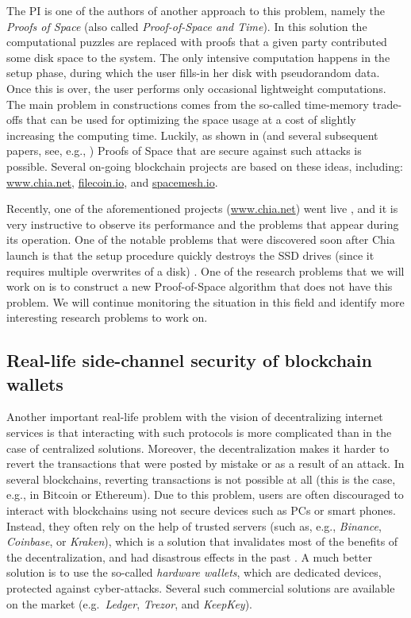 \documentclass{article}
\begin{document}
The PI is one of the authors of another approach to this problem, namely the \emph{Proofs of Space} \cite{Dziembowski2015} (also called \emph{Proof-of-Space and Time}). In this solution the computational puzzles are replaced with proofs that a given party contributed some disk space to the system. The only intensive computation happens in the setup phase, during which the user fills-in her disk with pseudorandom data. Once this is over, the user performs only occasional lightweight computations. The main problem in constructions comes from the so-called time-memory trade-offs that can be used for optimizing the space usage at a cost of slightly increasing the computing time. Luckily, as shown in \cite{Dziembowski2015} (and several subsequent papers, see, e.g., \cite{Ren2016,Pietrzak2019,Moran2019,Abusalah2017}) Proofs of Space that are secure against such attacks is possible. Several on-going blockchain projects are based on these ideas, including: \url{www.chia.net}, \url{filecoin.io}, and \url{spacemesh.io}. 

Recently, one of the aforementioned projects (\url{www.chia.net}) went live \cite{Hern}, and it is very instructive to observe its performance and the problems that appear during its operation. One of the notable problems that were discovered soon after Chia launch is that the setup procedure quickly destroys the SSD drives (since it requires multiple overwrites of a disk) \cite{Hern}. One of the research problems that we will work on is to construct a new Proof-of-Space algorithm that does not have this problem. We will continue monitoring the situation in this field and identify more interesting research problems to work on.




\subsection{Real-life side-channel security of blockchain wallets}\label{sec:side-channel}


Another important real-life problem with the vision of decentralizing internet services is that interacting with such protocols is more complicated than in the case of centralized solutions. Moreover, the decentralization makes it harder to revert the transactions that were posted by mistake or as a result of an attack. In several blockchains, reverting transactions is not possible at all (this is the case, e.g., in Bitcoin or Ethereum). Due to this problem, users are often discouraged to interact with blockchains using not secure devices such as PCs or smart phones. Instead, they often rely on the help of trusted servers (such as, e.g., \emph{Binance}, \emph{Coinbase}, or \emph{Kraken}), which is a solution that invalidates most of the benefits of the decentralization, and had disastrous effects in the past \cite{McMillan}. A much better solution is to use the so-called \emph{hardware wallets}, which are dedicated devices, protected against cyber-attacks. Several such commercial solutions are available on the market (e.g.~\emph{Ledger}, \emph{Trezor}, and \emph{KeepKey}). 
\end{document}
